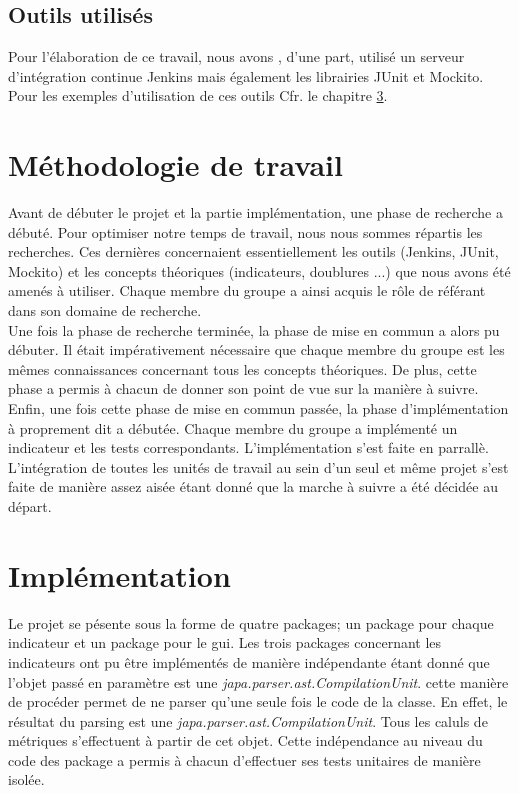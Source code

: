 \documentclass[11pt]{report}
\begin{document}
	\section{Outils utilisés}
	Pour l'élaboration de ce travail, nous avons , d'une part, utilisé un serveur d'intégration continue Jenkins mais également les librairies JUnit et Mockito. Pour les exemples d'utilisation de ces outils Cfr. le chapitre \ref{impl}. 

\chapter{Méthodologie de travail}
Avant de débuter le projet et la partie implémentation, une phase de recherche a débuté. Pour optimiser notre temps de travail, nous nous sommes répartis les recherches. Ces dernières concernaient essentiellement les outils (Jenkins, JUnit, Mockito)  et les concepts théoriques (indicateurs, doublures ...) que nous avons été amenés à utiliser. Chaque membre du groupe a ainsi acquis le rôle de référant dans son domaine de recherche.\\ 

Une fois la phase de recherche terminée, la phase de mise en commun a alors pu débuter. Il était impérativement nécessaire que chaque membre du groupe est les mêmes connaissances concernant tous les concepts théoriques. De plus, cette phase a permis à chacun de donner son point de vue sur la manière à suivre.\\ 

Enfin, une fois cette phase de mise en commun passée, la phase d'implémentation à proprement dit a débutée. Chaque membre du groupe a implémenté un indicateur et les tests correspondants. L'implémentation s'est faite en parrallè. L'intégration de toutes les unités de travail au sein d'un seul et même projet s'est faite de manière assez aisée étant donné que la marche à suivre a été décidée au départ. \\ 

\chapter{Implémentation}\label{impl}

	Le projet se pésente sous la forme de quatre packages; un package pour chaque indicateur et un package pour le gui. Les trois packages concernant les indicateurs ont pu être implémentés de manière indépendante étant donné que l'objet passé en paramètre est une \textit{japa.parser.ast.CompilationUnit}. cette manière de procéder permet de ne parser qu'une seule fois le code de la classe. En effet, le résultat du parsing est une \textit{japa.parser.ast.CompilationUnit}. Tous les caluls de métriques s'effectuent à partir de cet objet. Cette indépendance au niveau du code des package a permis à chacun d'effectuer ses tests unitaires de manière isolée.
	
\end{document}
